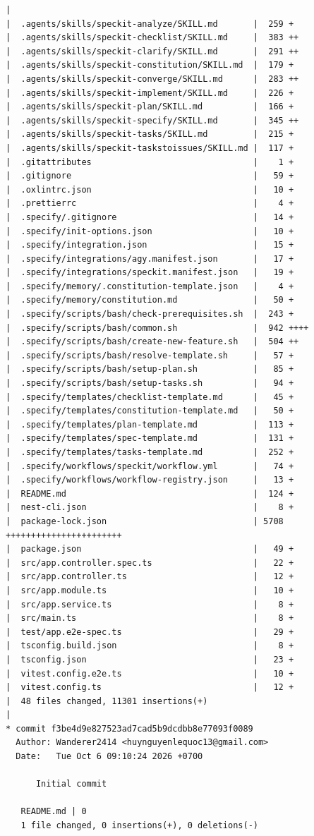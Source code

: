 \documentclass[12pt]{article}
\begin{document}
\begin{lstlisting}[numbers=none,breaklines=true]
|
|  .agents/skills/speckit-analyze/SKILL.md       |  259 +
|  .agents/skills/speckit-checklist/SKILL.md     |  383 ++
|  .agents/skills/speckit-clarify/SKILL.md       |  291 ++
|  .agents/skills/speckit-constitution/SKILL.md  |  179 +
|  .agents/skills/speckit-converge/SKILL.md      |  283 ++
|  .agents/skills/speckit-implement/SKILL.md     |  226 +
|  .agents/skills/speckit-plan/SKILL.md          |  166 +
|  .agents/skills/speckit-specify/SKILL.md       |  345 ++
|  .agents/skills/speckit-tasks/SKILL.md         |  215 +
|  .agents/skills/speckit-taskstoissues/SKILL.md |  117 +
|  .gitattributes                                |    1 +
|  .gitignore                                    |   59 +
|  .oxlintrc.json                                |   10 +
|  .prettierrc                                   |    4 +
|  .specify/.gitignore                           |   14 +
|  .specify/init-options.json                    |   10 +
|  .specify/integration.json                     |   15 +
|  .specify/integrations/agy.manifest.json       |   17 +
|  .specify/integrations/speckit.manifest.json   |   19 +
|  .specify/memory/.constitution-template.json   |    4 +
|  .specify/memory/constitution.md               |   50 +
|  .specify/scripts/bash/check-prerequisites.sh  |  243 +
|  .specify/scripts/bash/common.sh               |  942 ++++
|  .specify/scripts/bash/create-new-feature.sh   |  504 ++
|  .specify/scripts/bash/resolve-template.sh     |   57 +
|  .specify/scripts/bash/setup-plan.sh           |   85 +
|  .specify/scripts/bash/setup-tasks.sh          |   94 +
|  .specify/templates/checklist-template.md      |   45 +
|  .specify/templates/constitution-template.md   |   50 +
|  .specify/templates/plan-template.md           |  113 +
|  .specify/templates/spec-template.md           |  131 +
|  .specify/templates/tasks-template.md          |  252 +
|  .specify/workflows/speckit/workflow.yml       |   74 +
|  .specify/workflows/workflow-registry.json     |   13 +
|  README.md                                     |  124 +
|  nest-cli.json                                 |    8 +
|  package-lock.json                             | 5708 +++++++++++++++++++++++
|  package.json                                  |   49 +
|  src/app.controller.spec.ts                    |   22 +
|  src/app.controller.ts                         |   12 +
|  src/app.module.ts                             |   10 +
|  src/app.service.ts                            |    8 +
|  src/main.ts                                   |    8 +
|  test/app.e2e-spec.ts                          |   29 +
|  tsconfig.build.json                           |    8 +
|  tsconfig.json                                 |   23 +
|  vitest.config.e2e.ts                          |   10 +
|  vitest.config.ts                              |   12 +
|  48 files changed, 11301 insertions(+)
|
* commit f3be4d9e827523ad7cad5b9dcdbb8e77093f0089
  Author: Wanderer2414 <huynguyenlequoc13@gmail.com>
  Date:   Tue Oct 6 09:10:24 2026 +0700

      Initial commit

   README.md | 0
   1 file changed, 0 insertions(+), 0 deletions(-)
\end{lstlisting}
\end{document}
